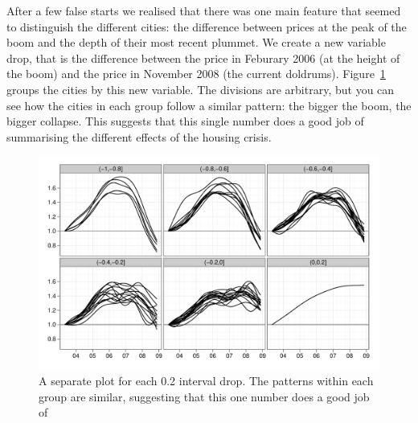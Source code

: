 \documentclass[oneside]{article}
\begin{document}
% 
% 

After a few false starts we realised that there was one main feature that seemed to distinguish the different cities: the difference between prices at the peak of the boom and the depth of their most recent plummet.  We create a new variable drop, that is the difference between the price in Feburary 2006 (at the height of the boom) and the price in November 2008 (the current doldrums). Figure~\ref{fig:groups} groups the cities by this new variable.  The divisions are arbitrary, but you can see how the cities in each group follow a similar pattern: the bigger the boom, the bigger collapse.  This suggests that this single number does a good job of summarising the different effects of the housing crisis.

\begin{figure}[htbp]
  \centering
    \includegraphics[width=0.75\linewidth]{cities-indexed-grouped}
  \caption{A separate plot for each 0.2 interval drop.  The patterns within each group are similar, suggesting that this one number does a good job of  }
  \label{fig:groups}
\end{figure}
\end{document}

